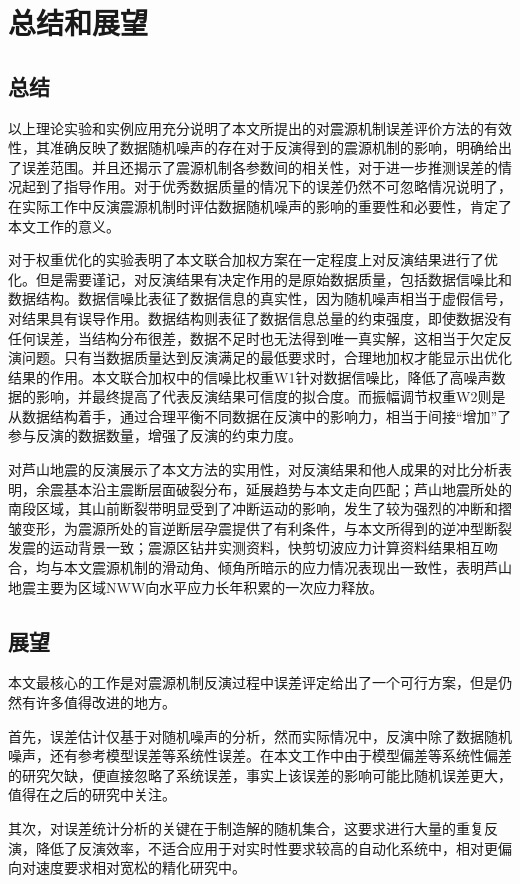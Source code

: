 

\chapter{总结和展望}
\section{总结}
以上理论实验和实例应用充分说明了本文所提出的对震源机制误差评价方法的有效性，其准确反映了数据随机噪声的存在对于反演得到的震源机制的影响，明确给出了误差范围。并且还揭示了震源机制各参数间的相关性，对于进一步推测误差的情况起到了指导作用。对于优秀数据质量的情况下的误差仍然不可忽略情况说明了，在实际工作中反演震源机制时评估数据随机噪声的影响的重要性和必要性，肯定了本文工作的意义。

对于权重优化的实验表明了本文联合加权方案在一定程度上对反演结果进行了优化。但是需要谨记，对反演结果有决定作用的是原始数据质量，包括数据信噪比和数据结构。数据信噪比表征了数据信息的真实性，因为随机噪声相当于虚假信号，对结果具有误导作用。数据结构则表征了数据信息总量的约束强度，即使数据没有任何误差，当结构分布很差，数据不足时也无法得到唯一真实解，这相当于欠定反演问题。只有当数据质量达到反演满足的最低要求时，合理地加权才能显示出优化结果的作用。本文联合加权中的信噪比权重W1针对数据信噪比，降低了高噪声数据的影响，并最终提高了代表反演结果可信度的拟合度。而振幅调节权重W2则是从数据结构着手，通过合理平衡不同数据在反演中的影响力，相当于间接“增加”了参与反演的数据数量，增强了反演的约束力度。

对芦山地震的反演展示了本文方法的实用性，对反演结果和他人成果的对比分析表明，余震基本沿主震断层面破裂分布，延展趋势与本文走向匹配；芦山地震所处的南段区域，其山前断裂带明显受到了冲断运动的影响，发生了较为强烈的冲断和摺皱变形，为震源所处的盲逆断层孕震提供了有利条件，与本文所得到的逆冲型断裂发震的运动背景一致；震源区钻井实测资料，快剪切波应力计算资料结果相互吻合，均与本文震源机制的滑动角、倾角所暗示的应力情况表现出一致性，表明芦山地震主要为区域NWW向水平应力长年积累的一次应力释放。

\section{展望}
本文最核心的工作是对震源机制反演过程中误差评定给出了一个可行方案，但是仍然有许多值得改进的地方。

首先，误差估计仅基于对随机噪声的分析，然而实际情况中，反演中除了数据随机噪声，还有参考模型误差等系统性误差。在本文工作中由于模型偏差等系统性偏差的研究欠缺，便直接忽略了系统误差，事实上该误差的影响可能比随机误差更大，值得在之后的研究中关注。

其次，对误差统计分析的关键在于制造解的随机集合，这要求进行大量的重复反演，降低了反演效率，不适合应用于对实时性要求较高的自动化系统中，相对更偏向对速度要求相对宽松的精化研究中。
